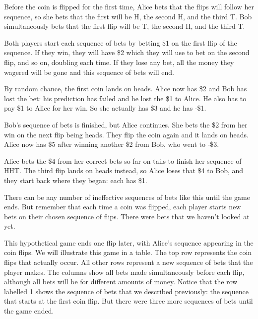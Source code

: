 \documentclass[english,12pt,a4paper,final]{article}
\begin{document}
Before the coin is flipped for the first time, Alice bets that the flips will follow her sequence, so she bets that the first will be H, the second H, and the third T. Bob simultaneously bets that the first flip will be T, the second H, and the third T. 

Both players start each sequence of bets by betting \$1 on the first flip of the sequence. If they win, they will have \$2 which they will use to bet on the second flip, and so on, doubling each time. If they lose any bet, all the money they wagered will be gone and this sequence of bets will end. 

By random chance, the first coin lands on heads. Alice now has \$2 and Bob has lost the bet: his prediction has failed and he lost the \$1 to Alice. He also has to pay \$1 to Alice for her win. So she actually has \$3 and he has -\$1. 

Bob's sequence of bets is finished, but Alice continues. She bets the \$2 from her win on the next flip being heads. They flip the coin again and it lands on heads. Alice  now has \$5 after winning another \$2 from Bob, who went to -\$3. 

Alice bets the \$4 from her correct bets so far on tails to finish her sequence of HHT. The third flip lands on heads instead, so Alice loses that \$4 to Bob, and they start back where they began: each has \$1.

There can be any number of ineffective sequences of bets like this until the game ends. But remember that each time a coin was flipped, each player starts new bets on their chosen sequence of flips. There were bets that we haven't looked at yet.

This hypothetical game ends one flip later, with Alice's sequence appearing in the coin flips. We will illustrate this game in a table. The top row represents the coin flips that actually occur. All other rows represent a new sequence of bets that the player makes. The columns show all bets made simultaneously before each flip, although all bets will be for different amounts of money. Notice that the row labelled 1 shows the sequence of bets that we described previously: the sequence that starts at the first coin flip. But there were three more sequences of bets until the game ended.
\end{document}
